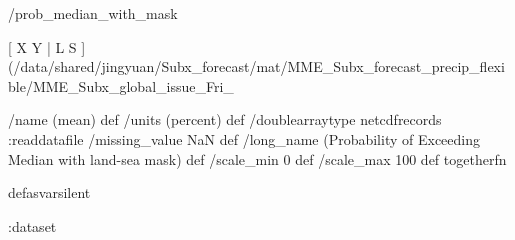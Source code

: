 \begin{ingrid}
/prob_median_with_mask {
[ X Y | L S ] (/data/shared/jingyuan/Subx_forecast/mat/MME_Subx_forecast_precip_flexible/MME_Subx_global_issue_Fri_%

/name (mean) def
/units (percent) def
/doublearraytype netcdfrecords :readdatafile
/missing_value NaN def
/long_name (Probability of Exceeding Median with land-sea mask) def
/scale_min 0 def
/scale_max 100 def
togetherfn
} defasvarsilent

:dataset
\end{ingrid}
